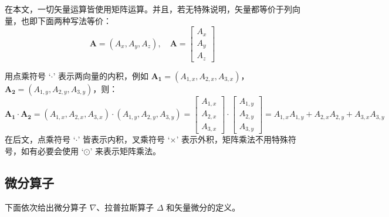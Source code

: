 \documentclass[UTF8]{report}
\theoremstyle{MyLineTheoremStyle} %
\theoremstyle{MyBlockTheoremStyle} %
\theoremstyle{MySubsubsectionStyle} %
\begin{document}
在本文，一切矢量运算皆使用矩阵运算。并且，若无特殊说明，矢量都等价于列向量，也即下面两种写法等价：
\begin{equation}
    \boldsymbol{A} = (A_x, A_y, A_z),\quad \boldsymbol{A} = \begin{bmatrix} A_x \\ A_y \\ A_z \end{bmatrix}
\end{equation}

用点乘符号 `$\cdot$' 表示两向量的内积，例如 $\boldsymbol{A_1} = (A_{1,x}, A_{2,x}, A_{3,x})$，$\boldsymbol{A_2} = (A_{1,y}, A_{2,y}, A_{3,y})$，则：
\begin{equation}
    \boldsymbol{A_1} \cdot \boldsymbol{A_2} = (A_{1,x}, A_{2,x}, A_{3,x})\cdot (A_{1,y}, A_{2,y}, A_{3,y}) = 
    \begin{bmatrix}
        A_{1,x} \\ A_{2,x} \\ A_{3,x}
    \end{bmatrix}\cdot
    \begin{bmatrix}
        A_{1,y} \\ A_{2,y} \\ A_{3,y}
    \end{bmatrix} =
    A_{1,x}A_{1,y} + A_{2,x}A_{2,y} + A_{3,x}A_{3,y}
\end{equation}
在后文，点乘符号 `$\cdot$' 皆表示内积，叉乘符号 `$\times$' 表示外积，矩阵乘法不用特殊符号，如有必要会使用 `$\odot $' 来表示矩阵乘法。


\subsection{微分算子}

下面依次给出微分算子 $\nabla$、拉普拉斯算子 $\Delta$ 和矢量微分的定义。
\end{document}
